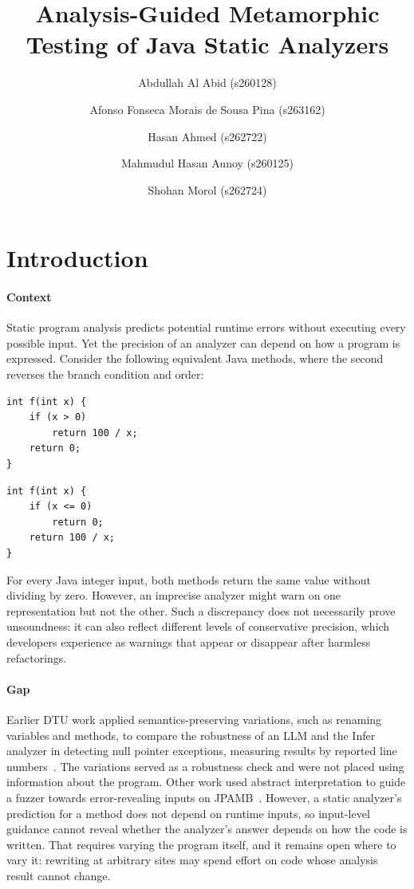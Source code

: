 \documentclass[review,nonacm,acmsmall]{acmart}
\title{Analysis-Guided Metamorphic Testing of Java Static Analyzers}
\author{Abdullah Al Abid (s260128)}
\author{Afonso Fonseca Morais de Sousa Pina (s263162)}
\author{Hasan Ahmed (s262722)}
\author{Mahmudul Hasan Aunoy (s260125)}
\author{Shohan Morol (s262724)}
\begin{document}
\maketitle

\section{Introduction}

\paragraph{Context}
Static program analysis predicts potential runtime errors without executing
every possible input. Yet the precision of an analyzer can depend on how a
program is expressed. Consider the following equivalent Java methods, where
the second reverses the branch condition and order:

\begin{minipage}[t]{0.47\linewidth}
\begin{lstlisting}
int f(int x) {
    if (x > 0)
        return 100 / x;
    return 0;
}
\end{lstlisting}
\end{minipage}
\hfill
\begin{minipage}[t]{0.47\linewidth}
\begin{lstlisting}
int f(int x) {
    if (x <= 0)
        return 0;
    return 100 / x;
}
\end{lstlisting}
\end{minipage}

For every Java integer input, both methods return the same value without
dividing by zero. However, an imprecise analyzer might warn on one
representation but not the other. Such a discrepancy does not necessarily
prove unsoundness: it can also reflect different levels of conservative
precision, which developers experience as warnings that appear or disappear
after harmless refactorings.

\paragraph{Gap}
Earlier DTU work applied semantics-preserving variations, such as renaming
variables and methods, to compare the robustness of an LLM and the Infer
analyzer in detecting null pointer exceptions, measuring results by reported
line numbers~\citep{chand2024}. The variations served as a robustness check
and were not placed using information about the program. Other work used
abstract interpretation to guide a fuzzer towards error-revealing inputs on
JPAMB~\citep{domingues2025}. However, a static analyzer's prediction for a
method does not depend on runtime inputs, so input-level guidance cannot
reveal whether the analyzer's answer depends on how the code is written.
That requires varying the program itself,
and it remains open where to vary it: rewriting at arbitrary sites may spend
effort on code whose analysis result cannot change.
\end{document}
